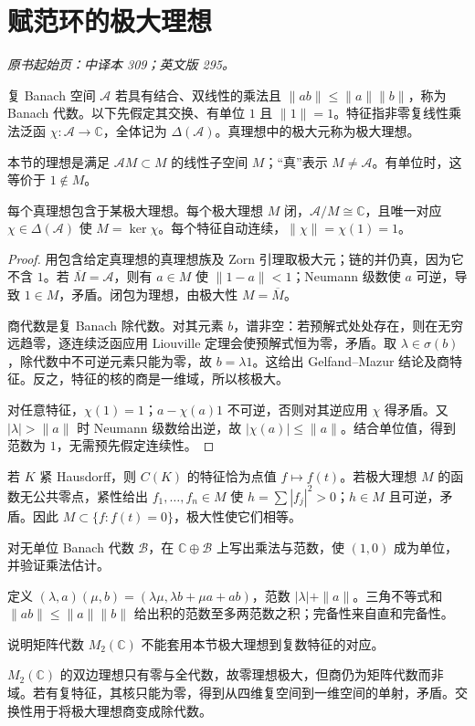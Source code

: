 \section{赋范环的极大理想}\label{sec:yosida-11-01}
\noindent\textit{原书起始页：中译本 309；英文版 295。}

\begin{definition}
复 Banach 空间 $\mathcal A$ 若具有结合、双线性的乘法且 $\|ab\|\le\|a\|\|b\|$，称为 Banach 代数。以下先假定其交换、有单位 $1$ 且 $\|1\|=1$。特征指非零复线性乘法泛函 $\chi:\mathcal A\to\mathbb C$，全体记为 $\Delta(\mathcal A)$。真理想中的极大元称为极大理想。
\end{definition}

本节的理想是满足 $\mathcal A M\subset M$ 的线性子空间 $M$；“真”表示 $M\ne\mathcal A$。有单位时，这等价于 $1\notin M$。

\begin{theorem}[极大理想与特征对应]\label{thm:y11-characters}
每个真理想包含于某极大理想。每个极大理想 $M$ 闭，$\mathcal A/M\cong\mathbb C$，且唯一对应 $\chi\in\Delta(\mathcal A)$ 使 $M=\ker\chi$。每个特征自动连续，$\|\chi\|=\chi(1)=1$。
\end{theorem}
\begin{proof}
用包含给定真理想的真理想族及 Zorn 引理取极大元；链的并仍真，因为它不含 $1$。若 $\overline M=\mathcal A$，则有 $a\in M$ 使 $\|1-a\|<1$；Neumann 级数使 $a$ 可逆，导致 $1\in M$，矛盾。闭包为理想，由极大性 $M=\overline M$。

商代数是复 Banach 除代数。对其元素 $b$，谱非空：若预解式处处存在，则在无穷远趋零，逐连续泛函应用 Liouville 定理会使预解式恒为零，矛盾。取 $\lambda\in\sigma(b)$，除代数中不可逆元素只能为零，故 $b=\lambda1$。这给出 Gelfand--Mazur 结论及商特征。反之，特征的核的商是一维域，所以核极大。

对任意特征，$\chi(1)=1$；$a-\chi(a)1$ 不可逆，否则对其逆应用 $\chi$ 得矛盾。又 $|\lambda|>\|a\|$ 时 Neumann 级数给出逆，故 $|\chi(a)|\le\|a\|$。结合单位值，得到范数为 $1$，无需预先假定连续性。
\end{proof}

\begin{example}[连续函数代数]
若 $K$ 紧 Hausdorff，则 $C(K)$ 的特征恰为点值 $f\mapsto f(t)$。若极大理想 $M$ 的函数无公共零点，紧性给出 $f_1,\ldots,f_n\in M$ 使 $h=\sum|f_j|^2>0$；$h\in M$ 且可逆，矛盾。因此 $M\subset\{f:f(t)=0\}$，极大性使它们相等。
\end{example}

\begin{exercise}[单位化]\label{ex:y11-unitization}
对无单位 Banach 代数 $\mathcal B$，在 $\mathbb C\oplus\mathcal B$ 上写出乘法与范数，使 $(1,0)$ 成为单位，并验证乘法估计。
\end{exercise}
\begin{solution}
定义 $(\lambda,a)(\mu,b)=(\lambda\mu,\lambda b+\mu a+ab)$，范数 $|\lambda|+\|a\|$。三角不等式和 $\|ab\|\le\|a\|\|b\|$ 给出积的范数至多两范数之积；完备性来自直和完备性。
\end{solution}

\begin{exercise}[交换性的位置]\label{ex:y11-noncommutative}
说明矩阵代数 $M_2(\mathbb C)$ 不能套用本节极大理想到复数特征的对应。
\end{exercise}
\begin{solution}
$M_2(\mathbb C)$ 的双边理想只有零与全代数，故零理想极大，但商仍为矩阵代数而非域。若有复特征，其核只能为零，得到从四维复空间到一维空间的单射，矛盾。交换性用于将极大理想商变成除代数。
\end{solution}
